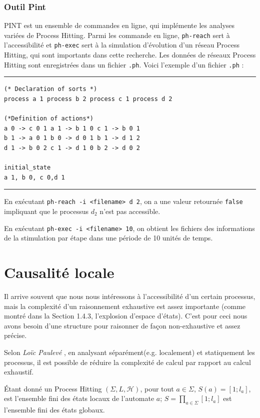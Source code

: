 \documentclass[11pt]{report}
\theoremstyle{definition}
\begin{document}
\subsection{Outil Pint}
{\large{P}}INT est un ensemble de commandes en ligne, qui impl\'emente les analyses vari\'ees de Process Hitting. Parmi les commande en ligne, \texttt{ph-reach} sert \`a l'accessibilit\'e et \texttt{ph-exec} sert \`a la simulation d'\'evolution d'un r\'eseau Process Hitting, qui sont importants dans cette recherche. Les donn\'ees de r\'eseaux Process Hitting sont enregistr\'ees dans un fichier \texttt{.ph}. Voici l'exemple d'un fichier \texttt{.ph} \citep{Pauleve2014} :
\vspace{0.2cm}
\hrule
\begin{verbatim}
(* Declaration of sorts *)
process a 1 process b 2 process c 1 process d 2

(*Definition of actions*)
a 0 -> c 0 1 a 1 -> b 1 0 c 1 -> b 0 1
b 1 -> a 0 1 b 0 -> d 0 1 b 1 -> d 1 2
d 1 -> b 0 2 c 1 -> d 1 0 b 2 -> d 0 2

initial_state 
a 1, b 0, c 0,d 1
\end{verbatim}
\hrule
En ex\'ecutant \texttt{ph-reach -i <filename> d 2}, on a une valeur retourn\'ee \texttt{false} impliquant que le processus $d_2$ n'est pas accessible.

En ex\'ecutant \texttt{ph-exec -i <filename> 10}, on obtient les fichiers des informations de la stimulation par \'etape dans une p\'eriode de 10 unit\'es de temps.

\chapter{Causalit\'e locale}
Il arrive souvent que nous nous int\'eressons \`a l'accessibilit\'e d'un certain processus, mais la complexit\'e d'un raisonnement exhaustive est assez importante (comme montr\'e dans la Section 1.4.3, l'explosion d'espace d'\'etats). C'est pour ceci nous avons besoin d'une structure pour raisonner de fa\c con non-exhaustive et assez pr\'ecise.

Selon \textit{Loïc Paulev\'e} \citep{Pauleve2013}, en analysant s\'epar\'ement(e.g. localement) et statiquement les processus, il est possible de r\'eduire la complexit\'e de calcul par rapport au calcul exhaustif.

\'Etant donn\'e un Process Hitting $(\Sigma,L,\mathscr{H})$, pour tout $a\in \Sigma$, $S(a)=[1;l_a]$, est l'ensemble fini des \'etats locaux de l'automate $a$; $S=\prod_{a\in\Sigma}[1;l_a]$ est l'ensemble fini des \'etats globaux.
\end{document}
